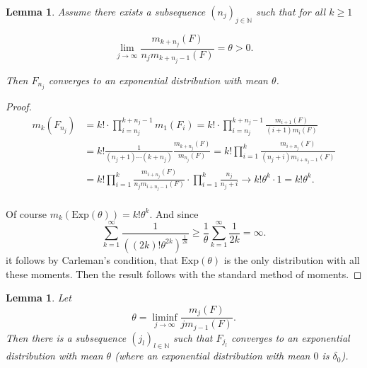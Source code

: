 \documentclass[12pt,a4paper]{scrartcl}
\newtheorem{lemma}[theorem]{Lemma}
\numberwithin{equation}{section}
\newcommand{\N}{\mathbb{N}} %
\begin{document}
\begin{lemma}
\label{subsequencelemmaone}
Assume there exists a subsequence $\left(n_j\right)_{j \in \N}$ such that for all $ k \geq 1 $

$$ \lim_{j \to \infty} \frac{m_{k+n_j}\left(F\right)}{n_j m_{k+n_j-1}\left(F\right)} = \theta > 0. $$

Then $F_{n_j}$ converges to an exponential distribution with mean $ \theta $.

\end{lemma}

\begin{proof}

\begin{align*}
m_k\left(F_{n_j}\right) 
&= k! \cdot \prod_{i=n_j}^{k+n_j-1}{m_1\left(F_i\right)} = k! \cdot \prod_{i=n_j}^{k+n_j-1} \frac{m_{i+1}\left(F\right)}{\left(i+1\right) m_i\left(F\right)} \\
&= k! \frac{1}{\left(n_j+1\right)\cdots \left(k+n_j\right)} \frac{m_{k+n_j}\left(F\right)}{m_{n_j}\left(F\right)} = k! \prod_{i=1}^k \frac{m_{i+n_j}\left(F\right)}{\left(n_j+i\right) m_{i+n_j-1}\left(F\right)} \\
&= k! \prod_{i=1}^k \frac{m_{i+n_j}\left(F\right)}{n_j m_{i+n_j-1}\left(F\right)} \cdot \prod_{i=1}^k \frac{n_j}{n_j+i} \to k! \theta^k \cdot 1 = k! \theta^k.
\end{align*} \\[1ex]

Of course $ m_k\left( \text{Exp}\left(\theta\right)\right) = k! \theta^k $. And since
$$ \sum_{k=1}^{\infty} \frac{1}{\left(\left(2k\right)!\theta^{2k}\right)^{\frac{1}{2k}}} \geq \frac{1}{\theta} \sum_{k=1}^{\infty} \frac{1}{2k} = \infty.$$
it follows by Carleman’s condition, that $\text{Exp}\left(\theta\right)$ is the only distribution with all these moments.
Then the result follows with the standard method of moments.

\end{proof}

\begin{lemma} \label{Weneeditlaterr}Let
\begin{equation*}
\theta = \liminf_{j \to \infty} \frac{m_{j}\left(F\right)}{j m_{j-1}\left(F\right)}.
\end{equation*}
Then there is a subsequence $\left(j_l\right)_{l \in \N}$ such that $ F_{j_l} $ converges to an exponential distribution with mean $\theta$ (where an exponential distribution with mean $0$ is $\delta_0$).
\end{lemma}
\end{document}
